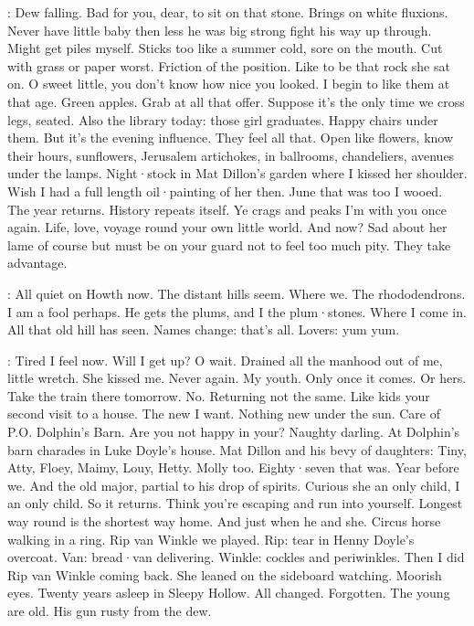 \Bloom:
Dew falling.
Bad for you,
dear,
to sit on that stone.
Brings on white fluxions.
Never have little baby then
less he was big strong
fight his way up through.
Might get piles myself.
Sticks too like a summer cold,
sore on the mouth.
Cut with grass or paper
worst.
Friction of the position.
Like to be that rock
she sat on.
O sweet little,
you don't know
how nice you looked.
I begin to like them at that age.
Green apples.
Grab at all that offer.
Suppose it's the only time we cross legs,
seated.
Also
the library today:
those girl graduates.
Happy chairs under them.
But
it's the evening influence.
They feel all that.
Open like flowers,
know their hours,
sunflowers,
Jerusalem artichokes,
in ballrooms,
chandeliers,
avenues under the lamps.
Night·stock in Mat Dillon's garden
where I kissed her shoulder.
Wish I had a full length oil·painting of her then.
June
that was too
I wooed.
The year returns.
History repeats itself.
Ye crags and peaks
I'm with you once again.
Life,
love,
voyage round
your own little world.
And now?
Sad about her lame
of course
but must be on your guard
not to feel too much pity.
They take advantage.

\Bloom:
All quiet on Howth now.
The distant hills seem.
Where we.
The rhododendrons.
I am a fool
perhaps.
He gets the plums,
and I
the plum·stones.
Where I come in.
All that old hill has seen.
Names change:
that's all.
Lovers:
yum yum.

\Bloom:
Tired I feel now.
Will I get up?
O wait.
Drained all the manhood out of me,
little wretch.
She kissed me.
Never again.
My youth.
Only once it comes.
Or hers.
Take the train there tomorrow.
No.
Returning
not the same.
Like kids
your second visit to a house.
The new
I want.
Nothing new under the sun.
Care of P.O. Dolphin's Barn.
Are you not happy in your?
Naughty darling.
At Dolphin's barn charades
in Luke Doyle's house.
Mat Dillon and his bevy of daughters:
Tiny,
Atty,
Floey,
Maimy,
Louy,
Hetty.
Molly too.
Eighty·seven that was.
Year before we.
And the old major,
partial to his drop of spirits.
Curious
she an only child,
I an only child.
So it returns.
Think you're escaping
and run into yourself.
Longest way round
is the shortest way home.
And just when he and she.
Circus horse
walking in a ring.
Rip van Winkle
we played.
Rip:
tear in Henny Doyle's overcoat.
Van:
bread·van delivering.
Winkle:
cockles and periwinkles.
Then I did Rip van Winkle coming back.
She leaned on the sideboard
watching.
Moorish eyes.
Twenty years asleep in Sleepy Hollow.
All changed.
Forgotten.
The young are old.
His gun rusty from the dew.


